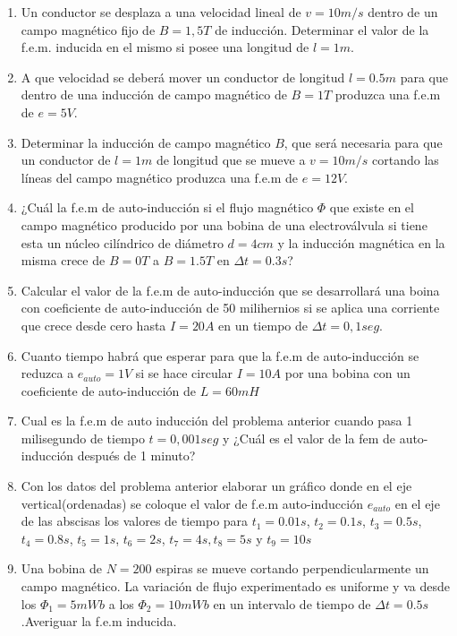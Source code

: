 \documentclass[../main]{subfiles}
\begin{document}

\begin{enumerate}
    \item Un conductor se desplaza a una velocidad lineal de $v=10m/s$ dentro de un campo magnético fijo de $B=1,5T$ de inducción. Determinar el valor de la f.e.m. inducida en el mismo si posee una longitud de $l=1m$.
    \item A que velocidad se deberá mover un conductor de longitud $l=0.5m$ para que dentro de una inducción de campo magnético de $B=1T$ produzca una f.e.m de $e=5V$.
    \item Determinar la inducción de campo magnético $B$, que será necesaria para que un conductor de $l=1m$ de longitud que se mueve a $v=10m/s$ cortando las líneas del campo magnético produzca una f.e.m de $e=12V$.
    \item ¿Cuál la f.e.m de auto-inducción si el flujo magnético $\Phi$ que existe en el campo magnético producido por una bobina de una electroválvula si tiene esta un núcleo cilíndrico de diámetro $d=4cm$ y la inducción magnética en la misma crece de $B=0T$ a $B=1.5T$ en $\Delta t=0.3s$?
    \item Calcular el valor de la f.e.m de auto-inducción que se desarrollará una boina con coeficiente de auto-inducción de 50 milihernios si se aplica una corriente que crece desde cero hasta $I=20A$ en un tiempo de $\Delta t=0,1 seg.$
    \item Cuanto tiempo habrá que esperar para que la f.e.m de auto-inducción se reduzca a $e_{auto}=1V$ si se hace circular $I=10A$ por una bobina con un coeficiente de auto-inducción de $L=60 mH$  
    \item Cual es la f.e.m de auto inducción del problema anterior cuando pasa 1 milisegundo de tiempo $t=0,001seg$ y ¿Cuál es el valor de la fem de auto-inducción después de 1 minuto?
    \item Con los datos del problema anterior elaborar un gráfico donde en el eje vertical(ordenadas) se coloque el valor de f.e.m auto-inducción $e_{auto}$  en el eje de las abscisas los valores de tiempo para $t_1=0.01s$, $t_2=0.1s$, $t_3=0.5s$, $t_4=0.8s$, $t_5=1s$, $t_6=2s$, $t_7=4s,t_8=5s$ y $t_9=10s$
    \item Una bobina de $N=200$ espiras se mueve cortando perpendicularmente un campo magnético. La variación de flujo experimentado es uniforme y va desde los $\Phi_1=5mWb$ a los $\Phi_2=10mWb$ en un intervalo de tiempo de $\Delta t = 0.5 s$.Averiguar la f.e.m inducida.

\end{enumerate}
\end{document}
